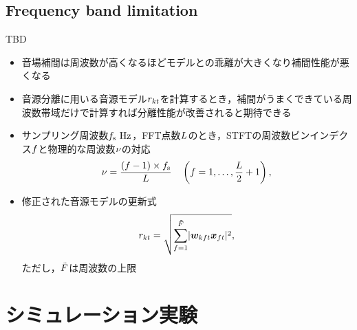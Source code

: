 \documentclass{article}
\begin{document}
\subsection{Frequency band limitation}
TBD
\begin{itemize}
  \item 音場補間は周波数が高くなるほどモデルとの乖離が大きくなり補間性能が悪くなる \cite{Wakabayashi:2020:ASJ:A}
  \item 音源分離に用いる音源モデル$r _{kt}$を計算するとき，補間がうまくできている周波数帯域だけで計算すれば分離性能が改善されると期待できる
  \item サンプリング周波数$\freqSamp~\unit{\hertz}$，FFT点数$L$のとき，STFTの周波数ビンインデクス$f$と物理的な周波数$\nu$の対応
    \begin{equation}
      \nu = \frac{(f - 1)\times f _{\mathrm{s}}}{L} \quad \left(f = 1, \dots, \frac{L}{2} + 1\right),
    \end{equation}
  \item 修正された音源モデルの更新式
    \begin{equation}
      r _{kt} = \sqrt{\sum _{f = 1} ^{\tilde{F}} \lvert \bm{w} _{kft} \bm{x} _{ft} \rvert ^2},
    \end{equation}
    ただし，$\tilde{F}$は周波数の上限
\end{itemize}

\section{シミュレーション実験}
\end{document}
